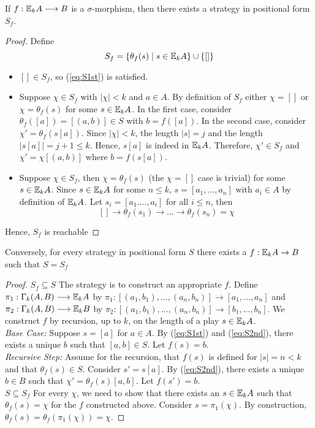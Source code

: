 \begin{prop}
If $f:{\mathbb{E}_{k}A} \longrightarrow B$ is a $\sigma$-morphism, then there exists a strategy in positional form $S_{f}$.
\begin{proof}
Define
$$S_{f} = \{\theta_{f}(s) \mid s \in {\mathbb{E}_{k}A}\} \cup \{[]\}$$
\begin{itemize}
\item $[] \in S_{f}$, so (\ref{eq:S1st}) is satisfied.
\item Suppose $\chi \in S_{f}$ with $|\chi| < k$ and $a \in A$. By definition of $S_{f}$ either $\chi = []$ or $\chi = \theta_{f}(s)$ for some $s \in {\mathbb{E}_{k}A}$. In the first case, consider $\theta_{f}([a]) = [(a,b)] \in S$ with $b = f([a])$. In the second case, consider $\chi' = \theta_{f}(s[a])$. Since $|\chi| < k$, the length $|s| = j$ and the length $|s[a]| = j+1 \leq k$. Hence, $s[a]$ is indeed in ${\mathbb{E}_{k}A}$. Therefore, $\chi' \in S_{f}$ and $\chi' = \chi[(a,b)]$ where $b = f(s[a])$.  
\item Suppose $\chi \in S_{f}$, then $\chi = \theta_{f}(s)$ (the $\chi = []$ case is trivial) for some $s \in {\mathbb{E}_{k}A}$. Since $s \in {\mathbb{E}_{k}A}$ for some $n \leq k$, $s = [a_{1},\dots,a_{n}]$ with $a_{i} \in A$ by definition of ${\mathbb{E}_{k}A}$. Let $s_{i} = [a_{1}.\dots,a_{i}]$ for all $i \leq n$, then
$$ [] \longrightarrow \theta_{f}(s_{1}) \longrightarrow \dots \longrightarrow \theta_{f}(s_{n}) = \chi$$
\end{itemize}
Hence, $S_{f}$ is reachable
\end{proof}
\label{prop:fToPosFormEF}
\end{prop}
\begin{prop}
Conversely, for every strategy in positional form $S$ there exists a $f:{\mathbb{E}_{k}A} \rightarrow B$ such that $S = S_{f}$
\begin{proof}
$S_{f} \subseteq S$ The strategy is to construct an appropriate $f$. Define $\pi_{1}:\Gamma_{k}(A,B) \longrightarrow {\mathbb{E}_{k}A}$ by $\pi_{1}:[(a_{1},b_{1}),\dots,(a_{n},b_{n})] \longrightarrow [a_{1},\dots,a_{n}]$ and $\pi_{2}:\Gamma_{k}(A,B) \longrightarrow {\mathbb{E}_{k}B}$ by $\pi_{2}:[(a_{1},b_{1}),\dots,(a_{n},b_{n})] \longrightarrow [b_{1},\dots,b_{n}]$. We construct $f$ by recursion, up to $k$, on the length of a play $s \in {\mathbb{E}_{k}A}$. \\ 
\textit{Base Case:} Suppose $s = [a]$ for $a \in A$. By (\ref{eq:S1st}) and (\ref{eq:S2nd}), there exists a unique $b$ such that $[a,b] \in S$. Let $f(s) = b$. \\    
\textit{Recursive Step:} Assume for the recursion, that $f(s)$ is defined for $|s| = n < k$ and that $\theta_{f}(s) \in S$. Consider $s' = s[a]$. By (\ref{eq:S2nd}), there exists a unique $b \in B$ such that $\chi' = \theta_{f}(s)[a,b]$. Let $f(s') = b$. \\      
$S \subseteq S_{f}$ For every $\chi$, we need to show that there exists an $s \in {\mathbb{E}_{k}A}$ such that $\theta_{f}(s) = \chi$ for the $f$ constructed above. Consider $s = \pi_{1}(\chi)$. By construction, $\theta_{f}(s) = \theta_{f}(\pi_{1}(\chi)) = \chi$.    
\end{proof}
\label{prop:posFormToFEF}
\end{prop}

